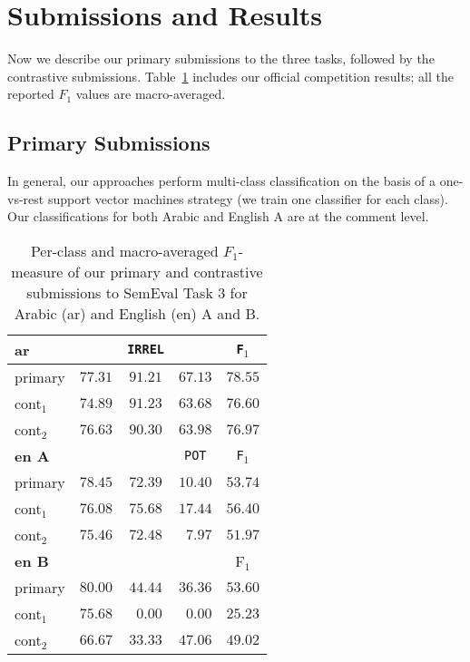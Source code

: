 \section{Submissions and Results}
\label{sec:experiments}

Now we describe our primary submissions to the three tasks, followed by the 
contrastive submissions. Table~\ref{tab:results} includes our official 
competition results; all the reported $F_1$ values are macro-averaged.

\subsection{Primary Submissions}

In general, our approaches perform multi-class classification on the basis of a 
one-vs-rest support vector machines strategy (\ie we train one classifier for 
each class). Our classifications for both Arabic and English A are at the
comment level.

\begin{table}%
\centering
\footnotesize
\begin{tabular}{|l|cccc|}
  \hline
  \bf ar	& \dir & \texttt{IRREL} & \rel & \texttt{F$_1$}\\  \hline  
  primary	& $77.31$ & $91.21$	& $67.13$	&  $78.55$ \\
  cont$_1$	& $74.89$ & $91.23$	& $63.68$	&  $76.60$ \\
  cont$_2$	& $76.63$ & $90.30$	& $63.98$	& $76.97$ \\  
  \hline \hline

  \bf en A	& \good   & \bad 	& \texttt{POT}	& \texttt{F$_1$}\\\hline
  primary	& $78.45$ & $72.39$	& $10.40$	& $53.74$ \\
  cont$_1$ 	& $76.08$ & $75.68$	& $17.44$	& $56.40$ \\
  cont$_2$ 	& $75.46$ & $72.48$ 	& $\,\,\,7.97$	& $51.97$ \\
\hline  \hline

\bf en B	& \yes	  & \no		& \unsure	& F$_1$	 \\
  \hline  
  primary	& $80.00$ & $44.44$	& $36.36$	& $53.60$ \\
  cont$_1$ 	& $75.68$ & $\,\,\,0.00$& $\,\,\,0.00$	& $25.23$ \\
  cont$_2$ 	& $66.67$ & $33.33$ 	& $47.06$	& $49.02$ \\
  \hline
 \end{tabular}
\caption{Per-class and macro-averaged $F_1$-measure of our primary and 
contrastive submissions to SemEval Task 3 for Arabic (ar) and English 
(en) A and B.
\label{tab:results}}
\end{table}

